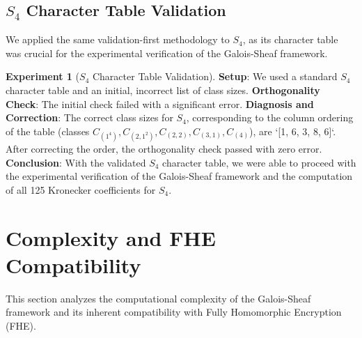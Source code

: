 \documentclass[11pt]{article}
\theoremstyle{definition}
\newtheorem{experiment}[theorem]{Experiment}
\theoremstyle{remark}
\begin{document}
\subsection{$S_4$ Character Table Validation}
We applied the same validation-first methodology to $S_4$, as its character table was crucial for the experimental verification of the Galois-Sheaf framework.

\begin{experiment}[$S_4$ Character Table Validation]\label{exp:s4}
\textbf{Setup}: We used a standard $S_4$ character table and an initial, incorrect list of class sizes.
\textbf{Orthogonality Check}: The initial check failed with a significant error.
\textbf{Diagnosis and Correction}: The correct class sizes for $S_4$, corresponding to the column ordering of the table (classes $C_{(1^4)}, C_{(2,1^2)}, C_{(2,2)}, C_{(3,1)}, C_{(4)}$), are `[1, 6, 3, 8, 6]`. After correcting the order, the orthogonality check passed with zero error.
\textbf{Conclusion}: With the validated $S_4$ character table, we were able to proceed with the experimental verification of the Galois-Sheaf framework and the computation of all 125 Kronecker coefficients for $S_4$.
\end{experiment}

\section{Complexity and FHE Compatibility}

This section analyzes the computational complexity of the Galois-Sheaf framework and its inherent compatibility with Fully Homomorphic Encryption (FHE).
\end{document}
